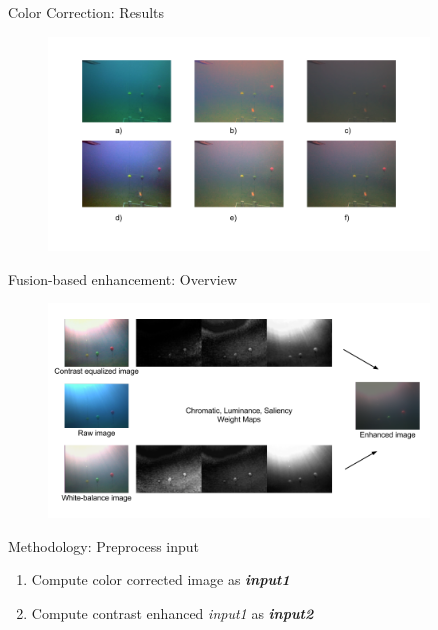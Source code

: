 \documentclass[14pt]{beamer}
\begin{document}
\begin{frame}{Color Correction: Results}

  \begin{figure}[ht]
      \centering
      \includegraphics[width=0.9\textwidth, height=0.6\textwidth]{figs/color_constancy.png}
  \end{figure}

\end{frame}

\begin{frame}{Fusion-based enhancement: Overview}

  \begin{figure}[ht]
      \centering
      \includegraphics[width=0.9\textwidth, height=0.6\textwidth]{figs/fusion_pipeline.png}
  \end{figure}

\end{frame}

\begin{frame}{Methodology: Preprocess input}
  \begin{enumerate}
    \item Compute color corrected image as \textbf{\textit{input1}}
    \item Compute contrast enhanced \textit{input1} as \textbf{\textit{input2}}
  \end{enumerate}
\end{frame}
\end{document}
